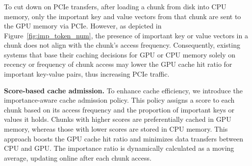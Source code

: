 \subsubsection{\techBb{}}
\label{sec:techbb}
To cut down on PCIe transfers, after loading a chunk from disk into CPU
memory, only the important key and value vectors from that chunk are sent to the
GPU memory via PCIe. However, as depicted in Figure~\ref{fig:imp_token_num}, the
presence of important key or value vectors in a chunk does not align with the
chunk's access frequency. Consequently, existing systems that base their caching
decisions for GPU or CPU memory solely on recency or frequency of chunk access
may lower the GPU cache hit ratio for important key-value pairs, thus increasing
PCIe traffic.

\noindent \textbf{Score-based cache admission.}
To enhance cache efficiency, we introduce the importance-aware cache admission policy.
This policy assigns a score to each chunk based on its access frequency and the
proportion of important keys or values it holds. Chunks with higher scores are
preferentially cached in GPU memory, whereas those with lower scores are stored
in CPU memory. This approach boosts the GPU cache hit ratio and minimizes data
transfers between CPU and GPU. The importance ratio is dynamically calculated as
a moving average, updating online after each chunk access.





